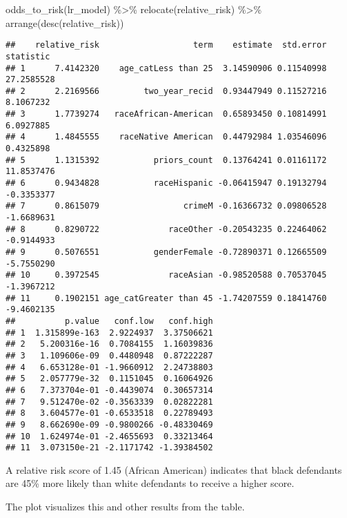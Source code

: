 \documentclass[
]{book}
\newenvironment{Shaded}{\begin{snugshade}}{\end{snugshade}}
\newcommand{\FunctionTok}[1]{\textcolor[rgb]{0.00,0.00,0.00}{#1}}
\newcommand{\NormalTok}[1]{#1}
\newcommand{\SpecialCharTok}[1]{\textcolor[rgb]{0.00,0.00,0.00}{#1}}
\begin{document}
\begin{Shaded}
\begin{Highlighting}[]
\FunctionTok{odds\_to\_risk}\NormalTok{(lr\_model) }\SpecialCharTok{\%\textgreater{}\%}
  \FunctionTok{relocate}\NormalTok{(relative\_risk) }\SpecialCharTok{\%\textgreater{}\%}
  \FunctionTok{arrange}\NormalTok{(}\FunctionTok{desc}\NormalTok{(relative\_risk))}
\end{Highlighting}
\end{Shaded}

\begin{verbatim}
##    relative_risk                   term    estimate  std.error  statistic
## 1      7.4142320    age_catLess than 25  3.14590906 0.11540998 27.2585528
## 2      2.2169566         two_year_recid  0.93447949 0.11527216  8.1067232
## 3      1.7739274   raceAfrican-American  0.65893450 0.10814991  6.0927885
## 4      1.4845555    raceNative American  0.44792984 1.03546096  0.4325898
## 5      1.1315392           priors_count  0.13764241 0.01161172 11.8537476
## 6      0.9434828           raceHispanic -0.06415947 0.19132794 -0.3353377
## 7      0.8615079                 crimeM -0.16366732 0.09806528 -1.6689631
## 8      0.8290722              raceOther -0.20543235 0.22464062 -0.9144933
## 9      0.5076551           genderFemale -0.72890371 0.12665509 -5.7550290
## 10     0.3972545              raceAsian -0.98520588 0.70537045 -1.3967212
## 11     0.1902151 age_catGreater than 45 -1.74207559 0.18414760 -9.4602135
##          p.value   conf.low   conf.high
## 1  1.315899e-163  2.9224937  3.37506621
## 2   5.200316e-16  0.7084155  1.16039836
## 3   1.109606e-09  0.4480948  0.87222287
## 4   6.653128e-01 -1.9660912  2.24738803
## 5   2.057779e-32  0.1151045  0.16064926
## 6   7.373704e-01 -0.4439074  0.30657314
## 7   9.512470e-02 -0.3563339  0.02822281
## 8   3.604577e-01 -0.6533518  0.22789493
## 9   8.662690e-09 -0.9800266 -0.48330469
## 10  1.624974e-01 -2.4655693  0.33213464
## 11  3.073150e-21 -2.1171742 -1.39384502
\end{verbatim}

A relative risk score of 1.45 (African American) indicates that black defendants are 45\% more likely than white defendants to receive a higher score.

The plot visualizes this and other results from the table.
\end{document}
